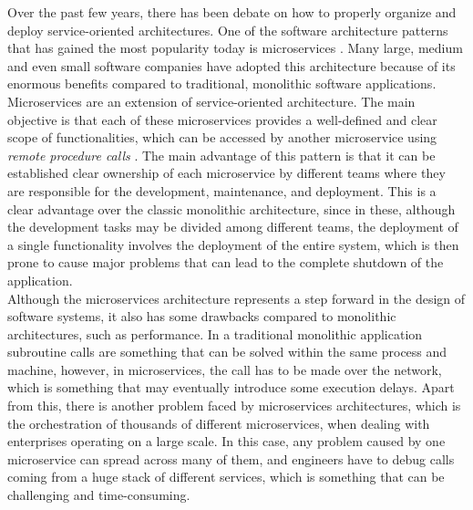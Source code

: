 \documentclass[english, 12pt, a4paper, sci, utf8, a-1b, online]{aaltothesis}
\begin{document}

Over the past few years, there has been debate on how to properly organize and deploy service-oriented architectures. One of the software architecture patterns that has gained the most popularity today is microservices \cite{MicroservicesAdoption}. Many large, medium and even small software companies have adopted this architecture because of its enormous benefits compared to traditional, monolithic software applications.\\

Microservices are an extension of service-oriented architecture. The main objective is that each of these microservices provides a well-defined and clear scope of functionalities, which can be accessed by another microservice using \textit{remote procedure calls} \cite{nelson1981remote}. The main advantage of this pattern is that it can be established clear ownership of each microservice by different teams where they are responsible for the development, maintenance, and deployment. This is a clear advantage over the classic monolithic architecture, since in these, although the development tasks may be divided among different teams, the deployment of a single functionality involves the deployment of the entire system, which is then prone to cause major problems that can lead to the complete shutdown of the application.\\

Although the microservices architecture represents a step forward in the design of software systems, it also has some drawbacks compared to monolithic architectures, such as performance. In a traditional monolithic application subroutine calls are something that can be solved within the same process and machine, however, in microservices, the call has to be made over the network, which is something that may eventually introduce some execution delays. Apart from this, there is another problem faced by microservices architectures, which is the orchestration of thousands of different microservices, when dealing with enterprises operating on a large scale. In this case, any problem caused by one microservice can spread across many of them, and engineers have to debug calls coming from a huge stack of different services, which is something that can be challenging and time-consuming.\\
\end{document}
